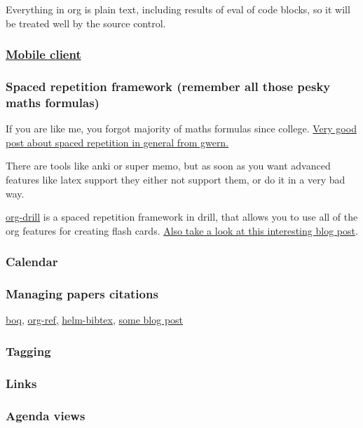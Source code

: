 \documentclass[11pt]{article}
\begin{document}
Everything in org is plain text, including results of eval of code blocks, so it will be treated well by the source control.
\subsubsection{\href{https://play.google.com/store/apps/details?id=com.orgzly&hl=en_GB}{Mobile client}}
\label{sec:orgheadline16}
\subsubsection{Spaced repetition framework (remember all those pesky maths formulas)}
\label{sec:orgheadline17}
If you are like me, you forgot majority of maths formulas since college.
\href{https://www.gwern.net/Spaced\%2520repetition}{Very good post about spaced repetition in general from gwern.}

There are tools like anki or super memo, but as soon as you want advanced features like
latex support they either not support them, or do it in a very bad way.

\href{http://orgmode.org/worg/org-contrib/org-drill.html}{org-drill} is a spaced repetition framework in drill, that allows you to use all of the org features for creating flash cards.
\href{http://www.giovannicarmantini.com/2015/07/putting-some-make-up-on-my-org-mode-flashcards}{Also take a look at this interesting blog post}.
\subsubsection{Calendar}
\label{sec:orgheadline18}
\subsubsection{Managing papers citations}
\label{sec:orgheadline19}
\href{https://github.com/kyleam/bog}{boq}, \href{https://github.com/jkitchin/org-ref}{org-ref,} \href{https://github.com/tmalsburg/helm-bibtex}{helm-bibtex,} \href{http://www.mkbehr.com/posts/a-research-workflow-with-zotero-and-org-mode/}{some blog post}
\subsubsection{Tagging}
\label{sec:orgheadline20}
\subsubsection{Links}
\label{sec:orgheadline21}
\subsubsection{Agenda views}
\label{sec:orgheadline22}
\end{document}
